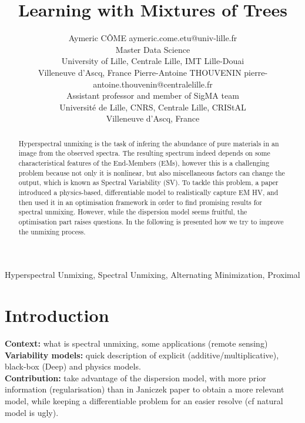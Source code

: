 \documentclass{article}
\begin{document}
\title{Learning with Mixtures of Trees}

\author{\name Aymeric CÔME \email aymeric.come.etu@univ-lille.fr \\
       \addr Master Data Science\\
       University of Lille, Centrale Lille, IMT Lille-Douai\\
       Villeneuve d'Ascq, France
       \AND
       \name Pierre-Antoine THOUVENIN \email pierre-antoine.thouvenin@centralelille.fr \\
       \addr Assistant professor and member of SigMA team\\
       Université de Lille, CNRS, Centrale Lille, CRIStAL\\
       Villeneuve d'Ascq, France}

\maketitle

\begin{abstract}%
  Hyperspectral unmixing is the task of infering the abundance of pure materials in an image from the observed spectra. The resulting spectrum indeed depends on some characteristical features of the End-Members (EMs), however this is a challenging problem because not only it is nonlinear, but also miscellaneous factors can change the output, which is known as Spectral Variability (SV). To tackle this problem, a paper \citep{janiczek_differentiable_2020} introduced a physics-based, differentiable model to realistically capture EM HV, and then used it in an optimisation framework in order to find promising results for spectral unmixing. However, while the dispersion model seems fruitful, the optimisation part raises questions. In the following is presented how we try to improve the unmixing process.
\end{abstract}

\begin{keywords}
Hyperspectral Unmixing, Spectral Unmixing, Alternating Minimization, Proximal
\end{keywords}

\section{Introduction}
\textbf{Context:} what is spectral unmixing, some applications (remote sensing)\\
\textbf{Variability models:} quick description of explicit (additive/multiplicative), black-box (Deep) and physics models.\\
\textbf{Contribution:} take advantage of the dispersion model, with more prior information (regularisation) than in Janiczek paper to obtain a more relevant model, while keeping a differentiable problem for an easier resolve (cf natural model is ugly).\\
\end{document}
